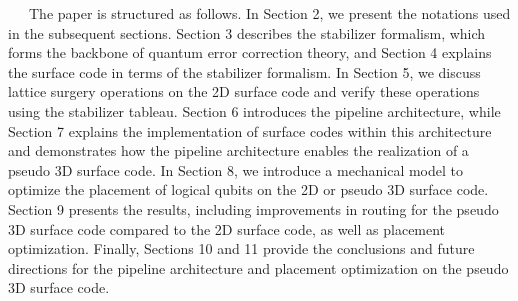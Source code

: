 \documentclass[a4paper,11pt]{ltjsarticle}
\begin{document}
\ \ \ The paper is structured as follows. In Section 2, we present the notations used in the subsequent sections. Section 3 describes the stabilizer formalism, which forms the backbone of quantum error correction theory, and Section 4 explains the surface code in terms of the stabilizer formalism. In Section 5, we discuss lattice surgery operations on the 2D surface code and verify these operations using the stabilizer tableau. Section 6 introduces the pipeline architecture, while Section 7 explains the implementation of surface codes within this architecture and demonstrates how the pipeline architecture enables the realization of a pseudo 3D surface code. In Section 8, we introduce a mechanical model to optimize the placement of logical qubits on the 2D or pseudo 3D surface code. Section 9 presents the results, including improvements in routing for the pseudo 3D surface code compared to the 2D surface code, as well as placement optimization. Finally, Sections 10 and 11 provide the conclusions and future directions for the pipeline architecture and placement optimization on the pseudo 3D surface code.
\end{document}
